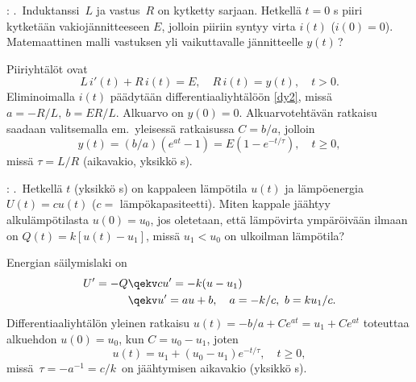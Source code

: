 \begin{Exa}: 
.\ Induktanssi $\,L$ ja vastus $\,R$ on kytketty sarjaan. Hetkellä $t=0$ s
piiri kytketään vakiojännitteeseen $E$, jolloin piiriin syntyy virta $i(t)$ ($i(0)=0$).
Matemaattinen malli vastuksen yli vaikuttavalle jännitteelle $y(t)\,$?
\end{Exa}
\ratk Piiriyhtälöt ovat
\[ 
L\,i'(t) + R\,i(t) = E, \quad R\,i(t) = y(t), \quad t>0. 
\]
Eliminoimalla $i(t)$ päädytään differentiaaliyhtälöön \eqref{dy2}, missä
$a = -R/L,\ b = ER/L$. Alkuarvo on $y(0)=0$. Alkuarvotehtävän ratkaisu saadaan valitsemalla
em.\ yleisessä ratkaisussa $C = b/a$, jolloin
\[ 
y(t) = (b/a)(e^{at}-1) = E(1-e^{-t/\tau}), \quad t \ge 0,
\]
missä $\tau = L/R$ (aikavakio, yksikkö s). \loppu
{}%
\begin{Exa}: .\ Hetkellä $t$ (yksikkö s) on kappaleen lämpötila $u(t)$ ja
lämpöenergia $U(t) = cu(t)$ ($c =$ lämpökapasiteetti). Miten kappale jäähtyy alkulämpötilasta
$u(0)=u_0$, jos oletetaan, että lämpövirta ympäröivään ilmaan on $Q(t) = k[u(t)-u_1]$, missä
$u_1 < u_0$ on ulkoilman lämpötila?
\end{Exa}
\ratk Energian säilymislaki on
\begin{align*}
U' = -Q &\qekv cu' = -k(u-u_1) \\
        &\qekv u' = au + b, \quad a = -k/c,\ b = ku_1/c.
\end{align*}
Differentiaaliyhtälön yleinen ratkaisu $u(t) = -b/a + C e^{at} = u_1 + C e^{at}$ toteuttaa 
alkuehdon $u(0)=u_0$, kun $C=u_0-u_1$, joten
\[ 
u(t) = u_1 + (u_0-u_1) e^{-t/\tau}, \quad t \ge 0, 
\]
missä $\,\tau = -a^{-1} = c/k\,$ on jäähtymisen aikavakio (yksikkö s). \loppu

